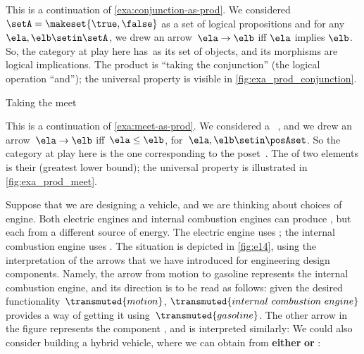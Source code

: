 \begin{example}
    \label{exa:conjunction-as-prod-cont}
    This is a continuation of \cref{exa:conjunction-as-prod}.
    We considered~$\setA = \makeset{ \true, \false }$ as a set of logical propositions and for any~$\ela, \elb  \setin \setA$, we drew an arrow~$\ela \to \elb$ iff $\ela$ implies $\elb$.
    So, the category at play here has~\setA as its set of objects, and its morphisms are logical implications.
    The product is ``taking the conjunction'' (the logical operation ``and''); the universal property is visible in \cref{fig:exa_prod_conjunction}.

\end{example}

\begin{marginfigure}
    \centering
    \caption{Taking the meet}
    \label{fig:exa_prod_meet_cont}
\end{marginfigure}

\begin{example}
    \label{exa:meet-as-prod-cont}
    This is a continuation of \cref{exa:meet-as-prod}.
    We considered a ~\posA, and we drew an arrow~$\ela \to \elb$ iff~$\ela \leq \elb$, for~$\ela,\elb\setin \posAset$.
    So the category at play here is the one corresponding to the poset~\posA.
    The  of two elements is their  (greatest lower bound); the universal property is illustrated in \cref{fig:exa_prod_meet}.
\end{example}

\begin{example}
    Suppose that we are designing a vehicle, and we are thinking about choices of engine.
    Both electric engines and internal combustion engines can produce , but each from a different source of energy.
    The electric engine uses ; the internal combustion engine uses .
    The situation is depicted in \cref{fig:e14}, using the interpretation of the arrows that we have introduced for engineering design components.
    Namely, the arrow from motion to gasoline represents the internal combustion engine, and its direction is to be read as follows: given the desired functionality~$\transmuted{motion}$, $\transmuted{internal \ combustion \ engine}$ provides a way of getting it using~$\transmuted{gasoline}$.
    The other arrow in the figure represents the component , and is interpreted similarly:
    We could also consider building a hybrid vehicle, where we can obtain  from \textbf{either}  \textbf{or} :
\end{example}

